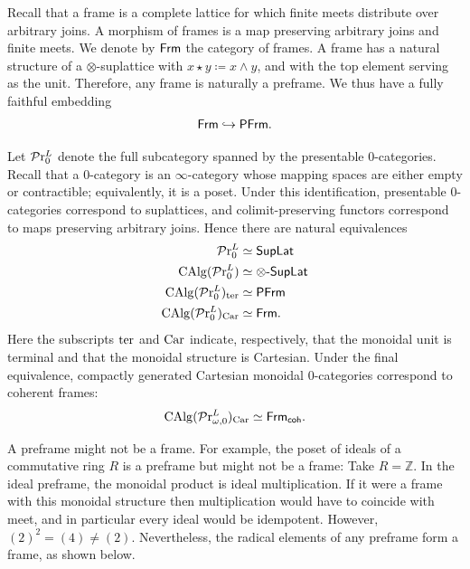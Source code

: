 \documentclass[10pt,a4paper,oneside]{article}
\begin{document}
\begin{rem}
Recall that a frame is a complete lattice for which finite meets distribute over arbitrary joins. A morphism of frames is a map preserving arbitrary joins and finite meets. We denote by $\mathsf{Frm}$ the category of frames. A frame has a natural structure of a $\otimes$-suplattice with $x \star y \coloneq x \wedge y$, and with the top element serving as the unit. Therefore, any frame is naturally a preframe. We thus have a fully faithful embedding
\[
\mathsf{Frm} \hookrightarrow \mathsf{PFrm}.
\]
\end{rem}
\begin{rem}[Categorification]\label{rem:categorification}
Let $\mathcal{P}\mathrm{r}^L_{0}$ denote the full subcategory spanned by the presentable $0$-categories. Recall that a $0$-category is an $\infty$-category whose mapping spaces are either empty or contractible; equivalently, it is a poset. Under this identification, presentable $0$-categories correspond to suplattices, and colimit-preserving functors correspond to maps preserving arbitrary joins. Hence there are natural equivalences
\[
\begin{aligned}
\mathcal{P}\mathrm{r}^L_{0} &\simeq \mathsf{SupLat} \\
\operatorname{CAlg}(\mathcal{P}\mathrm{r}^L_{0}) &\simeq \otimes\text{-}\mathsf{SupLat} \\
\operatorname{CAlg}(\mathcal{P}\mathrm{r}^L_0)_{\operatorname{ter}} &\simeq \mathsf{PFrm} \\
\operatorname{CAlg}(\mathcal{P}\mathrm{r}^L_0)_{\operatorname{Car}} &\simeq \mathsf{Frm}.
\end{aligned}
\]
Here the subscripts $\operatorname{ter}$ and $\operatorname{Car}$ indicate, respectively, that the monoidal unit is terminal and that the monoidal structure is Cartesian. Under the final equivalence, compactly generated Cartesian monoidal 0-categories correspond to coherent frames:
\begin{equation}\label{idencohfrm}
\operatorname{CAlg}(\mathcal{P}\mathrm{r}^L_{\omega,0})_{\operatorname{Car}}\simeq \mathsf{Frm}_{\mathsf{coh}}.
\end{equation}
\end{rem}

\begin{rem}
A preframe might not be a frame. For example, the poset of ideals of a commutative ring $R$ is a preframe but might not be a frame: Take $R=\mathbb{Z}$. In the ideal preframe, the monoidal product is ideal multiplication. If it were a frame with this monoidal structure then multiplication would have to coincide with meet, and in particular every ideal would be idempotent. However, $(2)^2=(4)\neq(2)$. Nevertheless, the radical elements of any preframe form a frame, as shown below.
\end{rem}
\end{document}
